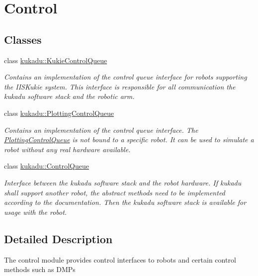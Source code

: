 \hypertarget{group__Control}{\section{Control}
\label{group__Control}
}
\subsection*{Classes}
\begin{DoxyCompactItemize}
\item 
class \hyperlink{classkukadu_1_1KukieControlQueue}{kukadu\-::\-Kukie\-Control\-Queue}
\begin{DoxyCompactList}\small\item\em Contains an implementation of the control queue interface for robots supporting the I\-I\-S\-Kukie system. This interface is responsible for all communication the kukadu software stack and the robotic arm. \end{DoxyCompactList}\item 
class \hyperlink{classkukadu_1_1PlottingControlQueue}{kukadu\-::\-Plotting\-Control\-Queue}
\begin{DoxyCompactList}\small\item\em Contains an implementation of the control queue interface. The \hyperlink{classkukadu_1_1PlottingControlQueue}{Plotting\-Control\-Queue} is not bound to a specific robot. It can be used to simulate a robot without any real hardware available. \end{DoxyCompactList}\item 
class \hyperlink{classkukadu_1_1ControlQueue}{kukadu\-::\-Control\-Queue}
\begin{DoxyCompactList}\small\item\em Interface between the kukadu software stack and the robot hardware. If kukadu shall support another robot, the abstract methods need to be implemented according to the documentation. Then the kukadu software stack is available for usage with the robot. \end{DoxyCompactList}\end{DoxyCompactItemize}


\subsection{Detailed Description}
The control module provides control interfaces to robots and certain control methods such as D\-M\-Ps 